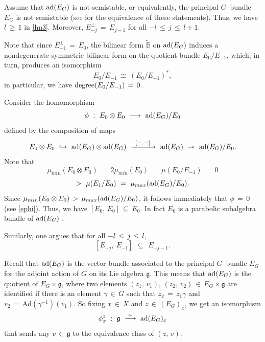 \documentclass[12pt, reqno]{amsart}
\numberwithin{equation}{section}
\begin{document}
Assume that ${\rm ad}(E_G)$ is not semistable, or equivalently, the principal $G$--bundle $E_{G}$ is not
semistable (see \cite[Proposition 2.10]{AB2} for the equivalence of these statements).
Thus, we have $l\,\geq\, 1$ in \eqref{hn3}. Moreover, $E_{-j}^{\perp}\,=\,E_{j-1}$ for all $-l\,\leq\, j\,
\leq \, l+1$.

Note that since $E_{-1}^{\perp}\,=\,E_{0}$, the bilinear form $\widetilde{\mathbb{B}}$ on ${\rm ad}(E_G)$
induces a nondegenerate symmetric bilinear form on the quotient bundle $E_{0}/E_{-1}$, which, in turn,
produces an isomorphism
$$E_{0}/E_{-1}\ \cong\ (E_{0}/E_{-1})^{*},$$ in particular, we have
${\rm degree}(E_{0}/E_{-1})\,=\,0$.

Consider the homomorphism
\begin{equation}\label{ephi}
\phi\ :\ E_{0}\otimes E_{0}\ \longrightarrow\ {\rm ad}(E_G)/E_{0}
\end{equation}
defined by the composition of maps
\[E_{0}\otimes E_{0}\ \hookrightarrow\ {\rm ad}(E_G)\otimes {\rm ad}(E_G)\ \xrightarrow{\,\,\,[-,\,-]\,\,\,}\
{\rm ad}(E_G)\ \twoheadrightarrow\ {\rm ad}(E_G)/E_{0}.\]
Note that $$\mu_{min}(E_{0}\otimes E_{0})\ =\ 2\mu_{min}(E_{0})\ =\ \mu(E_{0}/E_{-1})\ =\ 0
$$
$$
>\ \mu(E_{1}/E_{0})\ =\ \mu_{max}({\rm ad}(E_G)/E_{0}).$$
Since $\mu_{min}(E_{0}\otimes E_{0})\, >\, \mu_{max}({\rm ad}(E_G)/E_{0})$, it follows immediately
that $\phi\,=\, 0$ (see \eqref{ephi}).
Thus, we have $[E_{0},\, E_{0}]\,\subseteq\, E_{0}$. In fact $E_{0}$ is a parabolic subalgebra bundle of
${\rm ad}(E_G)$ \cite[\S~10]{AB3}. 

Similarly, one argues that for all $-l\, \leq\, j\,\leq\, l$,
\begin{equation}\label{c}
[E_{-j},\ E_{-1}]\,\ \subseteq\,\ E_{-j-1}.
\end{equation}

Recall that ${\rm ad}(E_G)$ is the vector bundle associated to the principal $G$--bundle $E_G$ for the
adjoint action of $G$ on its Lie algebra $\mathfrak g$. This means that ${\rm ad}(E_G)$ is the quotient 
of $E_G\times {\mathfrak g}$, where two elements $(z_1,\, v_1),\, (z_2,\, v_2)\, \in\, E_G\times {\mathfrak g}$
are identified if there is an element $\gamma\, \in\, G$ such that $z_2\,=\, z_1\gamma$ and $v_2\,=\,
\text{Ad}(\gamma^{-1})(v_1)$. So fixing $x\, \in\, X$ and $z\, \in\, (E_{G})_{x}$, we get an isomorphism
$$\phi^{z}_{x}\ :\ \mathfrak{g}\ \overset{\sim}\longrightarrow\ {\rm ad}(E_G)_x$$
that sends any $v\, \in\, \mathfrak g$ to the equivalence class of $(z,\, v)$.
\end{document}
